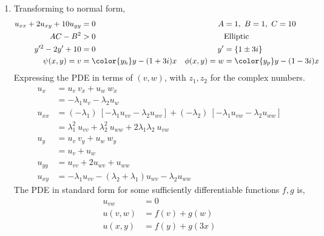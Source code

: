 \begin{enumerate}
    \item Transforming to normal form,
          \begin{align}
              u_{xx} + 2u_{xy} + 10u_{yy} & = 0                         &
              A                           & = 1,\ B = 1,\ C = 10          \\
              AC - B^2                    & > 0                         &
                                          & \text{Elliptic}               \\
              y'^2 - 2y' + 10             & = 0                         &
              y'                          & = \{1 \pm 3i\}                \\
              \psi(x, y) = v              & = \color{y_h} y - (1 + 3i)x &
              \phi(x, y) = w              & = \color{y_p} y - (1 - 3i)x
          \end{align}
          Expressing the PDE in terms of $ (v, w) $, with $ z_1, z_2 $ for the complex
          numbers.
          \begin{align}
              u_{x}  & = u_v\ v_x + u_w\ w_x                                 \\
                     & = -\lambda_1 u_v - \lambda_2 u_w                      \\
              u_{xx} & = (-\lambda_1)\ [-\lambda_1 u_{vv} - \lambda_2u_{wv}]
              + (-\lambda_2)\ [-\lambda_1 u_{vw} - \lambda_2 u_{ww}]         \\
                     & = \lambda_1^2\ u_{vv} + \lambda_2^2\ u_{ww} +
              2\lambda_1 \lambda_2\ u_{vw}                                   \\
              u_{y}  & = u_v\ v_y + u_w\ w_y                                 \\
                     & = u_v + u_w                                           \\
              u_{yy} & = u_{vv} + 2u_{wv} + u_{ww}                           \\
              u_{xy} & = -\lambda_1 u_{vv} - (\lambda_2 + \lambda_1) u_{wv}
              -\lambda_2 u_{ww}
          \end{align}
          The PDE in standard form for some sufficiently differentiable functions
          $ f, g $ is,
          \begin{align}
              u_{vw}  & = 0            \\
              u(v, w) & = f(v) + g(w)  \\
              u(x, y) & = f(y) + g(3x)
          \end{align}


\end{enumerate}

